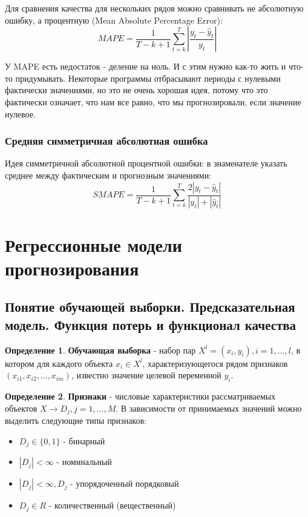 \documentclass[aps,%
12pt,%
final,%
oneside,
onecolumn,%
musixtex, %
superscriptaddress,%
centertags]{article} %
\theoremstyle{plain}
\theoremstyle{definition}
\newtheorem{definition}{Определение}[subsection]
\theoremstyle{remark}
\begin{document}
Для сравнения качества для нескольких рядов можно сравнивать не абсолютную ошибку, а процентную (Mean Absolute Percentage Error):
$$MAPE = \frac{1}{T-k+1}\sum\limits_{t=k}^T \left|\frac{y_t - \hat{y}_t}{y_t}\right|$$

У MAPE есть недостаток - деление на ноль. И с этим нужно как-то жить и что-то придумывать. Некоторые программы отбрасывают периоды с нулевыми фактически значениями, но это не очень хорошая идея, потому что это фактически означает, что нам все равно, что мы прогнозировали, если значение нулевое.
\newpage

\subsubsection{Средняя симметричная абсолютная ошибка}

Идея симметричной абсолютной процентной ошибки: в знаменателе указать среднее между фактическим и прогнозным значениями:
$$SMAPE = \frac{1}{T-k+1} \sum\limits_{t=k}^T \frac{2|y_t - \hat{y}_t|}{|y_t|+|\hat{y}_t|}$$

\newpage

\section{Регрессионные модели прогнозирования}

\subsection{Понятие обучающей выборки. Предсказательная модель. Функция потерь и функционал качества}

\begin{definition}
	\textbf{Обучающая выборка} - набор пар $X^l = (x_i,y_i), i = 1,\ldots,l$, в котором для каждого объекта $x_i \in X^l$, характеризующегося рядом признаков $(x_{i1},x_{i2},\ldots,x_{im})$, известно значение целевой переменной $y_i$.
\end{definition}

\begin{definition}
	\textbf{Признаки} - числовые характеристики рассматриваемых объектов $X \to D_j, j = 1,\ldots, M$. В зависимости от принимаемых значений можно выделить следующие типы признаков:
\end{definition}

\begin{itemize}
	\item $D_j \in  \{0,1\}$ - бинарный
	\item $|D_j| < \infty$ - номинальный
	\item $|D_j| < \infty, D_j$ - упорядоченный порядковый
	\item $D_j \in R$ - количественный (вещественный)
\end{itemize}
\end{document}
